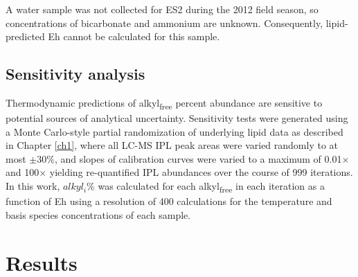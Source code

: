 A water sample was not collected for ES2 during the 2012 field season, so concentrations of bicarbonate and ammonium are unknown. Consequently, lipid-predicted Eh cannot be calculated for this sample.


\subsection{Sensitivity analysis}

Thermodynamic predictions of alkyl\textsubscript{free} percent abundance are sensitive to potential sources of analytical uncertainty. Sensitivity tests were generated using a Monte Carlo-style partial randomization of underlying lipid data as described in Chapter \ref{ch1}, where all LC-MS IPL peak areas were varied randomly to at most $\pm30\%$, and slopes of calibration curves were varied to a maximum of 0.01$\times$ and 100$\times$ yielding re-quantified IPL abundances over the course of 999 iterations. In this work, $alkyl_{i}\%$ was calculated for each alkyl\textsubscript{free} in each iteration as a function of Eh using a resolution of 400 calculations for the temperature and basis species concentrations of each sample.


\section{Results}

